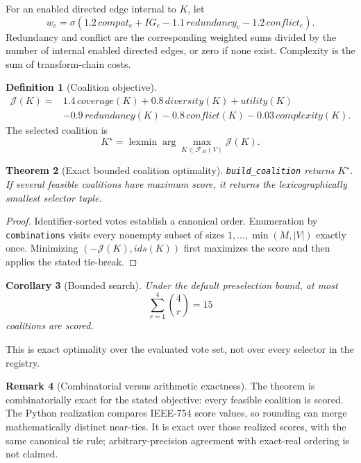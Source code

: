 \documentclass[11pt]{article}
\theoremstyle{definition}
\newtheorem{definition}{Definition}[section]
\newtheorem{remark}[definition]{Remark}
\theoremstyle{plain}
\newtheorem{theorem}[definition]{Theorem}
\newtheorem{corollary}[definition]{Corollary}
\newcommand{\arglexmin}{\operatorname{lexmin}}
\begin{document}
For an enabled directed edge internal to $K$, let
\[
w_e=\sigma(1.2\,compat_e+IG_e
-1.1\,redundancy_e-1.2\,conflict_e).
\]
Redundancy and conflict are the corresponding weighted sums divided by the
number of internal enabled directed edges, or zero if none exist.  Complexity
is the sum of transform-chain costs.

\begin{definition}[Coalition objective]
\[
\begin{split}
\mathcal J(K)={}&1.4\,coverage(K)+0.8\,diversity(K)+utility(K)\\
&-0.9\,redundancy(K)-0.8\,conflict(K)-0.03\,complexity(K).
\end{split}
\]
The selected coalition is
\[
K^\star=\arglexmin\arg\max_{K\in\mathcal F_M(V)}\mathcal J(K).
\]
\end{definition}

\begin{theorem}[Exact bounded coalition optimality]
\label{thm:coalition}
\texttt{build\_coalition} returns $K^\star$.  If several feasible coalitions
have maximum score, it returns the lexicographically smallest selector tuple.
\end{theorem}

\begin{proof}
Identifier-sorted votes establish a canonical order.  Enumeration by
\texttt{combinations} visits every nonempty subset of sizes
$1,\ldots,\min(M,|V|)$ exactly once.  Minimizing
$(-\mathcal J(K),ids(K))$ first maximizes the score and then applies the stated
tie-break.
\end{proof}

\begin{corollary}[Bounded search]
Under the default preselection bound, at most
\[
\sum_{r=1}^{4}\binom4r=15
\]
coalitions are scored.
\end{corollary}

This is exact optimality over the evaluated vote set, not over every selector
in the registry.

\begin{remark}[Combinatorial versus arithmetic exactness]
The theorem is combinatorially exact for the stated objective: every feasible
coalition is scored.  The Python realization compares IEEE-754 score values, so
rounding can merge mathematically distinct near-ties.  It is exact over those
realized scores, with the same canonical tie rule; arbitrary-precision
agreement with exact-real ordering is not claimed.
\end{remark}
\end{document}
